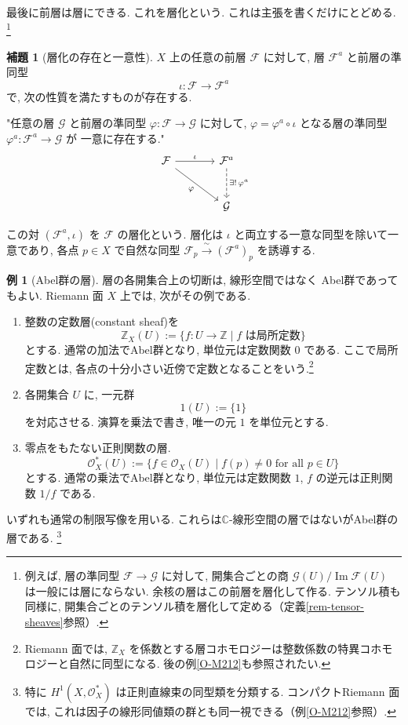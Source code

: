 \documentclass[dvipdfmx,a4paper,11pt]{article} %
\newcommand{\Z}{\mathbb{Z}}
\newcommand{\C}{\mathbb{C}}
\theoremstyle{definition}
\numberwithin{equation}{section}
\newtheorem{lem}[thm]{補題}
\newtheorem{exa}[thm]{例}
\begin{document}
最後に前層は層にできる. これを層化という. これは主張を書くだけにとどめる. \footnote{例えば, 層の準同型 $\mathcal F\to\mathcal G$ に対して, 開集合ごとの商 $\mathcal G(U)/\operatorname{Im}\mathcal F(U)$ は一般には層にならない. 余核の層はこの前層を層化して作る. テンソル積も同様に, 開集合ごとのテンソル積を層化して定める（定義\ref{rem-tensor-sheaves}参照）.
}
\begin{lem}[層化の存在と一意性]\label{O-M193}
$X$ 上の任意の前層 $\mathcal F$ に対して, 
層 $\mathcal F^a$ と前層の準同型
\[
\iota:\mathcal F\longrightarrow\mathcal F^a
\]
で, 次の性質を満たすものが存在する.

"任意の層 $\mathcal G$ と前層の準同型
$\varphi:\mathcal F\to\mathcal G$ に対して, 
\(
\varphi=\varphi^a\circ\iota
\)
となる層の準同型 $\varphi^a:\mathcal F^a\to\mathcal G$ が
一意に存在する."
\[
\begin{tikzcd}[column sep=large, row sep=large]
\mathcal F
  \arrow[r, "\iota"]
  \arrow[dr, swap, "\varphi"]
&
\mathcal F^a
  \arrow[d, dashed, "\exists!\,\varphi^a"]
\\
& \mathcal G
\end{tikzcd}
\]

この対 $(\mathcal F^a,\iota)$ を $\mathcal F$ の層化という.
層化は $\iota$ と両立する一意な同型を除いて一意であり, 
各点 $p\in X$ で自然な同型
\(
\mathcal F_p\xrightarrow{\;\sim\;}(\mathcal F^a)_p
\)
を誘導する.
\end{lem}


\begin{exa}[Abel群の層]\label{O-M189}
層の各開集合上の切断は, 線形空間ではなく
Abel群であってもよい.
Riemann 面 $X$ 上では, 次がその例である.
\begin{enumerate}
\item
整数の定数層(constant sheaf)を
\[
\Z_X(U)
:=\{f:U\to\Z\mid f\text{ は局所定数}\}
\]
とする.
通常の加法でAbel群となり, 単位元は定数関数 $0$ である.
ここで局所定数とは, 各点の十分小さい近傍で定数となることをいう.\footnote{Riemann 面では, $\Z_X$ を係数とする層コホモロジーは整数係数の特異コホモロジーと自然に同型になる. 後の例\ref{O-M212}も参照されたい.
}

\item

各開集合 $U$ に, 一元群
\[
1(U):=\{1\}
\]
を対応させる.
演算を乗法で書き, 唯一の元 $1$ を単位元とする.

\item

零点をもたない正則関数の層.
\[
\mathcal O_X^*(U)
:=\{f\in\mathcal O_X(U)\mid f(p)\neq0\text{ for all }p\in U\}
\]
とする.
通常の乗法でAbel群となり, 単位元は定数関数 $1$, 
$f$ の逆元は正則関数 $1/f$ である.
\end{enumerate}
いずれも通常の制限写像を用いる.
これらは$\C$-線形空間の層ではないがAbel群の層である. \footnote{特に $H^1(X,\mathcal O_X^*)$ は正則直線束の同型類を分類する. コンパクトRiemann 面では, これは因子の線形同値類の群とも同一視できる（例\ref{O-M212}参照）.
}

\end{exa}
\end{document}
